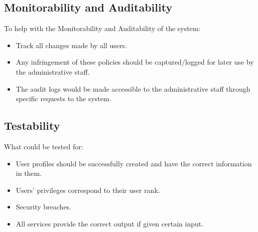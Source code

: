 \subsection{Monitorability and Auditability}
\begin{flushleft}
To help with the Monitorability and Auditability of the system:
\begin{itemize}
\item Track all changes made by all users. 
\item Any infringement of these policies should be captured/logged for later use by the administrative staff.
\item The audit logs would be made accessible to the administrative staff through specific requests to the system. 
\end{itemize}
\end{flushleft}

\subsection{Testability}
\begin{flushleft}
What could be tested for:
		\begin{itemize}
		\item User profiles should be successfully created and have the correct information in them.
		\item Users’ privileges correspond to their user rank.
		\item Security breaches.
		\item All services provide the correct output if given certain input.
		\end{itemize}

\end{flushleft}


